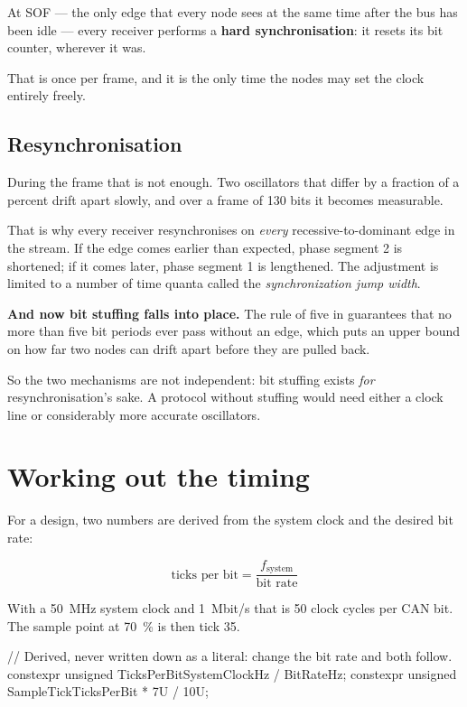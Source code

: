 At SOF --- the only edge that every node sees at the same time after the bus has been idle --- every
receiver performs a \textbf{hard synchronisation}: it resets its bit counter, wherever it was.

That is once per frame, and it is the only time the nodes may set the clock entirely freely.

\subsection{Resynchronisation}

During the frame that is not enough. Two oscillators that differ by a fraction of a percent drift
apart slowly, and over a frame of 130 bits it becomes measurable.

That is why every receiver resynchronises on \emph{every} recessive-to-dominant edge in the stream.
If the edge comes earlier than expected, phase segment 2 is shortened; if it comes later, phase
segment 1 is lengthened. The adjustment is limited to a number of time quanta called the
\emph{synchronization jump width}.

\textbf{And now bit stuffing falls into place.} The rule of five in  guarantees
that no more than five bit periods ever pass without an edge, which puts an upper bound on how far
two nodes can drift apart before they are pulled back.

\begin{aside}
So the two mechanisms are not independent: bit stuffing exists \emph{for} resynchronisation's sake.
A protocol without stuffing would need either a clock line or considerably more accurate
oscillators.
\end{aside}

\section{Working out the timing}

For a design, two numbers are derived from the system clock and the desired bit rate:

\[ \text{ticks per bit} = \frac{f_{\text{system}}}{\text{bit rate}} \]

With a 50~MHz system clock and 1~Mbit/s that is 50 clock cycles per CAN bit. The sample point at
70~\% is then tick 35.

\begin{cppcode}
// Derived, never written down as a literal: change the bit rate and both follow.
constexpr unsigned TicksPerBit{SystemClockHz / BitRateHz};
constexpr unsigned SampleTick{TicksPerBit * 7U / 10U};
\end{cppcode}

